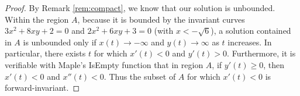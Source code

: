 \documentclass{amsart}
\numberwithin{equation}{section}
\theoremstyle{plain}
\theoremstyle{definition}
\theoremstyle{remark}
\numberwithin{table}{section}
\begin{document}
\begin{proof}
    By Remark \ref{rem:compact}, we know that our solution is unbounded. 
    Within the region $A$, because it is bounded by the invariant curves $3x^{2}+8xy+2 = 0$ and $2x^2 + 6xy + 3 = 0$ (with $x<-\sqrt{6}$), a solution contained in $A$ is unbounded only if $x(t)\to -\infty$ and $y(t) \to \infty$ as $t$ increases.
    In particular, there exists $t$ for which $x'(t) < 0$ and $y'(t) > 0$.
    Furthermore, it is verifiable with Maple's IsEmpty function that in region $A$, if $y'(t)\geq 0$, then $x'(t)<0$ and $x''(t)<0$.
    Thus the subset of $A$ for which $x'(t)<0$ is forward-invariant.

\end{proof}
\end{document}
